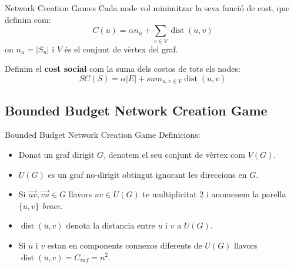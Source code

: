 \documentclass[aspectratio=169]{beamer}
\DeclareMathOperator{\dist}{dist}
\begin{document}
\begin{frame}{Network Creation Games}
    Cada node vol minimitzar la seva funció de cost, que definim com:
    \begin{equation*}
        C(u) = \alpha n_u + \sum_{v \in V}\dist(u,v)
    \end{equation*}
    on $n_u = |S_u|$ i $V$ és el conjunt de vèrtex del graf.
    
    \vspace{3mm}
    
    Definim el \textbf{cost social} com la suma dels costos de tots els nodes:
    \begin{equation*}
        SC(S) = \alpha |E| + sum_{u,v \in V} \dist(u,v)
    \end{equation*}
\end{frame}

\subsection{Bounded Budget Network Creation Game}
\begin{frame}{Bounded Budget Network Creation Game}
Definicions:
\begin{itemize}
    \item<1-> Donat un graf dirigit $G$, denotem el seu conjunt de vèrtex com $V(G)$.
    \item<2-> $U(G)$ es un graf no-dirigit obtingut ignorant les direccions en $G$.
    \item<3-> Si $\vec{uv}, \vec{vu} \in G$ llavors $uv \in U(G)$ te multiplicitat 2 i
        anomenem la parella $\{u, v\}$ \emph{brace}.
    \item<4-> $\dist(u, v)$ denota la distancia entre $u$ i $v$ a $U(G)$.
    \item<5-> Si $u$ i $v$ estan en components connexos diferents de $U(G)$ llavors
        $\dist(u, v) = C_{inf} = n^2$.
        
    
\end{itemize}
\end{frame} 
\end{document}
